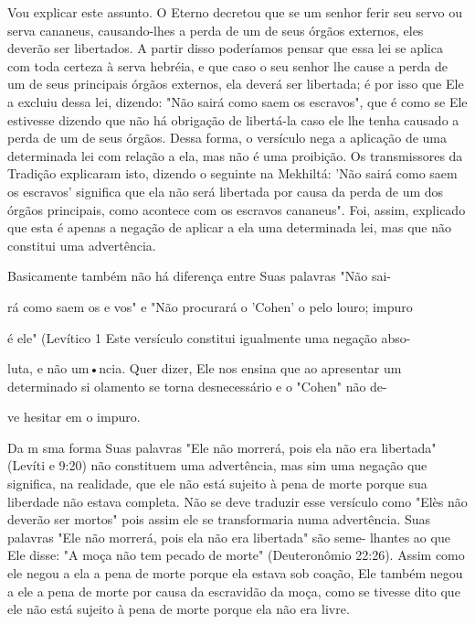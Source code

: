\begin{itemize}
\begin{enumrate}
Vou explicar este assunto. O Eterno decretou que se um senhor fe­rir seu
servo ou serva cananeus, causando-lhes a perda de um de seus órgãos
externos, eles deverão ser libertados. A partir disso poderíamos pensar
que es­sa lei se aplica com toda certeza à serva hebréia, e que caso o
seu senhor lhe cause a perda de um de seus principais órgãos externos,
ela deverá ser liberta­da; é por isso que Ele a excluiu dessa lei,
dizendo: "Não sairá como saem os escravos", que é como se Ele estivesse
dizendo que não há obrigação de liber­tá-la caso ele lhe tenha causado a
perda de um de seus órgãos. Dessa forma, o versículo nega a aplicação de
uma determinada lei com relação a ela, mas não é uma proibição. Os
transmissores da Tradição explicaram isto, dizendo o se­guinte na
Mekhiltá: 'Não sairá como saem os escravos' significa que ela não será
libertada por causa da perda de um dos órgãos principais, como acontece
com os escravos cananeus". Foi, assim, explicado que esta é apenas a
negação de aplicar a ela uma determinada lei, mas que não constitui uma
advertência.


Basicamente também não há diferença entre Suas palavras "Não sai-


rá como saem os e vos" e "Não procurará o 'Cohen' o pelo louro; impuro

é ele" (Levítico 1 Este versículo constitui igualmente uma negação abso-

luta, e não um•ncia. Quer dizer, Ele nos ensina que ao apresentar um\\
determinado si olamento se torna desnecessário e o "Cohen" não de-

ve hesitar em o impuro.

Da m sma forma Suas palavras "Ele não morrerá, pois ela não era
libertada" (Levíti e 9:20) não constituem uma advertência, mas sim uma
ne­gação que significa, na realidade, que ele não está sujeito à pena de
morte por­que sua liberdade não estava completa. Não se deve traduzir
esse versículo co­mo "Elès não deverão ser mortos" pois assim ele se
transformaria numa adver­tência. Suas palavras "Ele não morrerá, pois
ela não era libertada" são seme-
lhantes ao que Ele disse: "A moça não tem pecado de morte" (Deuteronômio
22:26). Assim como ele negou a ela a pena de morte porque ela estava sob
coa­ção, Ele também negou a ele a pena de morte por causa da escravidão
da moça, como se tivesse dito que ele não está sujeito à pena de morte
porque ela não era livre.


\end{enumrate}
\end{itemize}
